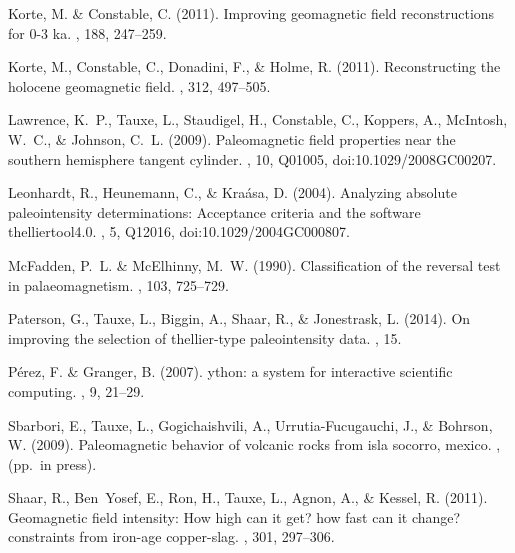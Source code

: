\documentclass[11pt]{book}
\begin{document}
{{{{{{\begin{thebibliography}{}
Korte, M. \& Constable, C. (2011).
\newblock Improving geomagnetic field reconstructions for 0-3 ka.
, 188, 247--259.

Korte, M., Constable, C., Donadini, F., \& Holme, R. (2011).
\newblock Reconstructing the holocene geomagnetic field.
, 312, 497--505.

Lawrence, K.~P., Tauxe, L., Staudigel, H., Constable, C., Koppers, A.,
  McIntosh, W.~C., \& Johnson, C.~L. (2009).
\newblock Paleomagnetic field properties near the southern hemisphere tangent
  cylinder.
, 10, Q01005,
  doi:10.1029/2008GC00207.

Leonhardt, R., Heunemann, C., \& Kra\'asa, D. (2004).
\newblock Analyzing absolute paleointensity determinations: Acceptance criteria
  and the software thelliertool4.0.
, 5, Q12016, doi:10.1029/2004GC000807.

McFadden, P.~L. \& McElhinny, M.~W. (1990).
\newblock Classification of the reversal test in palaeomagnetism.
, 103, 725--729.

Paterson, G., Tauxe, L., Biggin, A., Shaar, R., \& Jonestrask, L. (2014).
\newblock On improving the selection of thellier-type paleointensity data.
, 15.

P\'erez, F. \& Granger, B. (2007).
ython: a system for interactive scientific computing.
, 9, 21--29.

Sbarbori, E., Tauxe, L., Gogichaishvili, A., Urrutia-Fucugauchi, J., \&
  Bohrson, W. (2009).
\newblock Paleomagnetic behavior of volcanic rocks from isla socorro, mexico.
, (pp.\ in press).

Shaar, R., Ben~Yosef, E., Ron, H., Tauxe, L., Agnon, A., \& Kessel, R. (2011).
\newblock Geomagnetic field intensity: How high can it get? how fast can it
  change? constraints from iron-age copper-slag.
, 301, 297--306.


\end{thebibliography}}}}}}}
\end{document}
